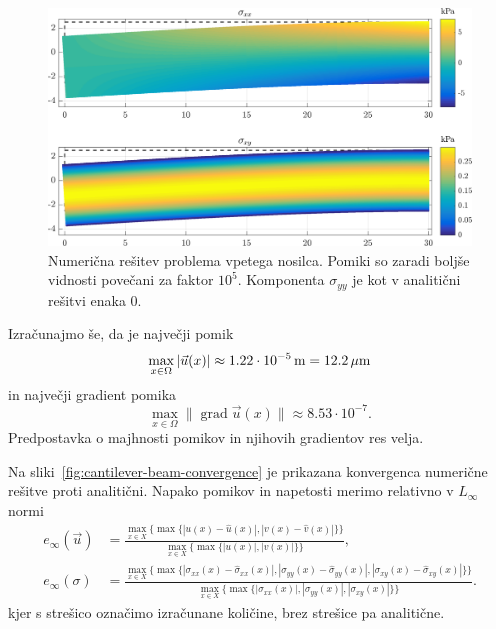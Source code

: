 \documentclass[12pt,a4paper,twoside]{article}
\theoremstyle{definition} %
\theoremstyle{plain} %
\numberwithin{equation}{section}
\newcommand{\grad}{\operatorname{grad}}
\newcommand{\vu}{\vec{u}}
\newcommand{\ts}{\sigma}
\newlength{\iw}
\begin{document}
\begin{figure}[h]
  \centering
  \includegraphics[width=\iw]{images/cantilever_beam_solution.png}
  \caption[Numerična rešitev problema vpetega nosilca.]{Numerična rešitev
  problema vpetega nosilca. Pomiki so zaradi boljše vidnosti povečani za faktor
  $10^5$. Komponenta $\ts_{yy}$ je kot v analitični rešitvi enaka 0.}
  \label{fig:cantilever-beam-solution}
\end{figure}
Izračunajmo še, da je največji pomik
\begin{equation}
  \max_{x \in \Omega} |\vu(x)| \approx \unit[1.22 \cdot 10^{-5}]{m} = \unit[12.2]{\mu m}
\end{equation}
in največji gradient pomika
\begin{equation}
  \max_{x \in \Omega} \|\grad \vu(x)\| \approx 8.53 \cdot 10^{-7}.
\end{equation}
Predpostavka o majhnosti pomikov in njihovih gradientov res velja.

Na sliki~\ref{fig:cantilever-beam-convergence} je prikazana konvergenca numerične rešitve proti
analitični.  Napako pomikov in napetosti merimo relativno v $L_\infty$ normi
\begin{align}
  e_\infty(\vu) &= \frac{\max_{x\in X} \{\max\{|u(x)-\hat u(x)|, |v(x)-\hat v(x)|\}\}}
  {\max_{x\in X} \{\max\{|u(x)|, |v(x)|\}\}}, \\
  e_\infty(\ts) &= \frac{\max_{x\in X} \{\max\{|\sigma_{xx}(x)-\hat{\sigma}_{xx}(x)|,
  |\sigma_{yy}(x)-\hat{\sigma}_{yy}(x)|,
  |\sigma_{xy}(x)-\hat{\sigma}_{xy}(x)| \}\}}{
  \max_{x\in X} \{\max\{|\sigma_{xx}(x)|, |\sigma_{yy}(x)|, |\sigma_{xy}(x)| \}\}}.
\end{align}
kjer s strešico označimo izračunane količine, brez strešice pa analitične.
\end{document}
